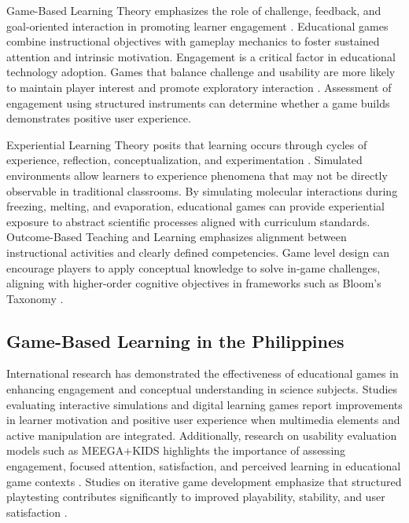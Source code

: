 Game-Based Learning Theory emphasizes the role of challenge, feedback, and goal-oriented interaction in promoting learner engagement \cite{Prensky2001}. Educational games combine instructional objectives with gameplay mechanics to foster sustained attention and intrinsic motivation. Engagement is a critical factor in educational technology adoption. Games that balance challenge and usability are more likely to maintain player interest and promote exploratory interaction \cite{Gee2003}. Assessment of engagement using structured instruments can determine whether a game builds demonstrates positive user experience.

Experiential Learning Theory posits that learning occurs through cycles of experience, reflection, conceptualization, and experimentation \cite{Kolb1984}. Simulated environments allow learners to experience phenomena that may not be directly observable in traditional classrooms. By simulating molecular interactions during freezing, melting, and evaporation, educational games can provide experiential exposure to abstract scientific processes aligned with curriculum standards. Outcome-Based Teaching and Learning emphasizes alignment between instructional activities and clearly defined competencies. Game level design can encourage players to apply conceptual knowledge to solve in-game challenges, aligning with higher-order cognitive objectives in frameworks such as Bloom's Taxonomy \cite{Anderson2001}.

\subsection{Game-Based Learning in the Philippines}

International research has demonstrated the effectiveness of educational games in enhancing engagement and conceptual understanding in science subjects. Studies evaluating interactive simulations and digital learning games report improvements in learner motivation and positive user experience when multimedia elements and active manipulation are integrated. Additionally, research on usability evaluation models such as MEEGA+KIDS highlights the importance of assessing engagement, focused attention, satisfaction, and perceived learning in educational game contexts \cite{vonWangenheim2020}. Studies on iterative game development emphasize that structured playtesting contributes significantly to improved playability, stability, and user satisfaction \cite{Sison2018}.

